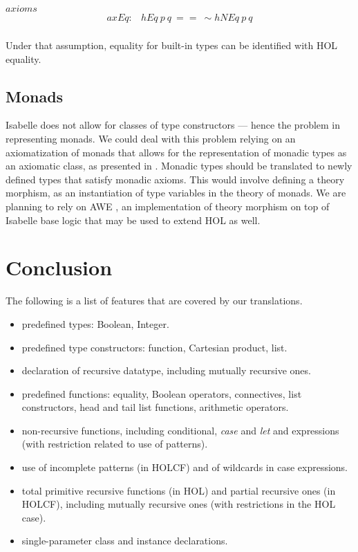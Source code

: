 \documentclass{llncs}
\begin{document}
\noindent $axioms$ 
$$\begin{array}{ll}
 axEq: & hEq \ p \ q \ == \ \sim hNEq \ p \ q \\
\end{array}$$

\noindent Under that assumption, equality for built-in types can be
identified with HOL equality.


\subsection{Monads}
\label{sec:Monads}

Isabelle does not allow for classes of type constructors --- hence the problem
in representing monads. We could deal with this problem relying on an
axiomatization of monads that allows for the representation of monadic types
as an axiomatic class, as presented in \cite{Lueth}. Monadic types should be
translated to newly defined types that satisfy monadic axioms. This would
involve defining a theory morphism, as an instantiation of type variables in
the theory of monads. We are planning to rely on AWE \cite{AWE}, an
implementation of theory morphism on top of Isabelle base logic that may be
used to extend HOL as well.


\section{Conclusion}

The following is a list of features that are covered by our
translations.

\begin{itemize} 
\item predefined types: Boolean, Integer.
\item predefined type constructors: function, Cartesian product, list.
\item declaration of recursive datatype, including mutually recursive ones.
\item predefined functions: equality, Boolean operators, connectives, list
  constructors, head and tail list functions, arithmetic operators.
\item non-recursive functions, including conditional, \emph{case} and
  \emph{let} and expressions (with restriction related to use of
  patterns).
\item use of incomplete patterns (in HOLCF) and of wildcards in case
  expressions.
\item total primitive recursive functions (in HOL) and partial recursive ones
  (in HOLCF), including mutually recursive ones (with restrictions in the HOL
  case).
\item single-parameter class and instance declarations.
\end{itemize}
\end{document}
